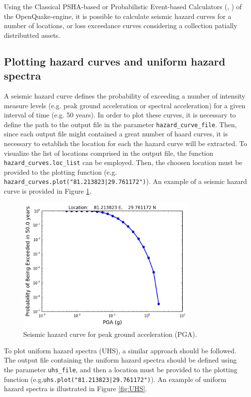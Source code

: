 Using the Classical PSHA-based or Probabilistic Event-based Calculators (\cite{SilvaEtAl2014a}, \cite{PaganiEtAl2014a}) of the OpenQuake-engine, it is possible to calculate seismic hazard curves for a number of locations, or loss exceedance curves considering a collection patially distributted assets.

\subsection{Plotting hazard curves and uniform hazard spectra}
\label{subsec:plot-hazard_curves}
A seismic hazard curve defines the probability of exceeding a number of intensity measure levels (e.g. peak ground acceleration or spectral acceleration) for a given interval of time (e.g. 50 years). In order to plot these curves, it is necessary to define the path to the output file in the parameter \verb=hazard_curve_file=. Then, since each output file might contained a great number of haard curves, it is necessary to establish the location for each the hazard curve will be extracted. To visualize the list of locations comprised in the output file, the function \verb=hazard_curves.loc_list= can be employed. Then, the choosen location must be provided to the plotting function (e.g. \verb=hazard_curves.plot("81.213823|29.761172")=). An example of a seismic hazard curve is provided in Figure \ref{fig:hazard_curve}.\\

\begin{figure}[htb]
  \centering
      \includegraphics[width=9cm]{Figures/hazard_curve.png}
  \caption{Seismic hazard curve for peak ground acceleration (PGA).}
  \label{fig:hazard_curve}
\end{figure}

To plot uniform hazard spectra (UHS), a similar approach should be followed. The output file containing the uniform hazard spectra should be defined using the parameter \verb=uhs_file=, and then a location must be provided to the plotting function (e.g.\verb=uhs.plot("81.213823|29.761172")=). An example of uniform hazard spectra is illustrated in Figure \ref{fig:UHS}.

